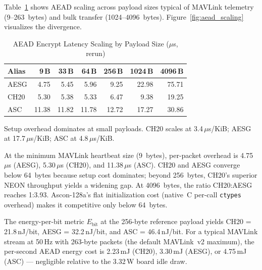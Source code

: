 Table~\ref{tab:aead_scaling} shows AEAD scaling across payload sizes
typical of MAVLink telemetry (9--263~bytes) and bulk transfer (1024--4096~bytes).
Figure~\ref{fig:aead_scaling} visualizes the divergence.

\begin{table}[t]
\centering
\caption{AEAD Encrypt Latency Scaling by Payload Size ($\mu$s, rerun)}
\label{tab:aead_scaling}
\footnotesize
\begin{tabular}{@{}lrrrrrr@{}}
\toprule
\textbf{Alias} &
  \textbf{9\,B} & \textbf{33\,B} & \textbf{64\,B} &
  \textbf{256\,B} & \textbf{1024\,B} & \textbf{4096\,B} \\
\midrule
AESG & 4.75  & 5.45  & 5.96  & 9.25  & 22.98 & 75.71 \\
CH20 & 5.30  & 5.38  & 5.33  & 6.47  & 9.38  & 19.25 \\
ASC  & 11.38 & 11.82 & 11.78 & 12.72 & 17.27 & 30.86 \\
\bottomrule
\end{tabular}
\begin{tablenotes}
\footnotesize
\item Setup overhead dominates at small payloads.
  CH20 scales at 3.4\,$\mu$s/KiB; AESG at 17.7\,$\mu$s/KiB; ASC at 4.8\,$\mu$s/KiB.
\end{tablenotes}
\end{table}

At the minimum MAVLink heartbeat size (9~bytes), per-packet
overhead is 4.75\,$\mu$s (AESG), 5.30\,$\mu$s (CH20), and
11.38\,$\mu$s (ASC).  CH20 and AESG converge below 64~bytes because
setup cost dominates; beyond 256~bytes, CH20's superior NEON throughput
yields a widening gap.  At 4096~bytes, the ratio CH20:AESG reaches
1:3.93.  Ascon-128a's flat initialization cost (native~C per-call
\texttt{ctypes} overhead) makes it competitive only below 64~bytes.

The energy-per-bit metric $E_\text{bit}$ at the 256-byte reference
payload yields CH20 = 21.8\,nJ/bit, AESG = 32.2\,nJ/bit, and ASC =
46.4\,nJ/bit.  For a typical MAVLink stream at 50\,Hz with 263-byte
packets (the default MAVLink~v2 maximum), the per-second AEAD energy
cost is 2.23\,mJ (CH20), 3.30\,mJ (AESG), or 4.75\,mJ (ASC) —
negligible relative to the 3.32\,W board idle draw.

